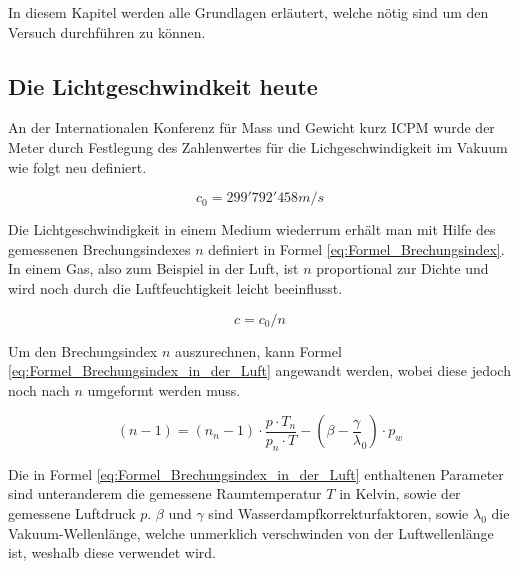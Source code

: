 In diesem Kapitel werden alle Grundlagen erläutert, welche nötig sind um den Versuch durchführen zu können. 
\subsection{Die Lichtgeschwindkeit heute}
An der Internationalen Konferenz für Mass und Gewicht kurz ICPM wurde der Meter durch Festlegung des Zahlenwertes für die Lichgeschwindigkeit im Vakuum wie folgt neu definiert.

\begin{equation*}
c_{0} = 299'792'458 m/s
\label{eq:Lichtgeschwindigkeit}
\end{equation*}

Die Lichtgeschwindigkeit in einem Medium wiederrum erhält man mit Hilfe des gemessenen Brechungsindexes $n$ definiert in Formel \ref{eq:Formel_Brechungsindex}. In einem Gas, also zum Beispiel in der Luft, ist $n$ proportional zur Dichte und wird noch durch die Luftfeuchtigkeit leicht beeinflusst.

\begin{equation}
c=c_{0}/n
\label{eq:Formel_Brechungsindex}
\end{equation}

Um den Brechungsindex $n$ auszurechnen, kann Formel \ref{eq:Formel_Brechungsindex_in_der_Luft} angewandt werden, wobei diese jedoch noch nach $n$ umgeformt werden muss.

\begin{equation}
(n - 1) = (n_{n} - 1)\cdot\dfrac{p \cdot T_{n}}{p_{n} \cdot T}-(\beta - \dfrac{\gamma}{\lambda}_{0}) \cdot p_{w}
\label{eq:Formel_Brechungsindex_in_der_Luft}
\end{equation}

Die in Formel \ref{eq:Formel_Brechungsindex_in_der_Luft} enthaltenen Parameter sind unteranderem die gemessene Raumtemperatur $T$ in Kelvin, sowie der gemessene Luftdruck $p$. $\beta$ und $\gamma$ sind Wasserdampfkorrekturfaktoren, sowie $\lambda_{0}$ die Vakuum-Wellenlänge, welche unmerklich verschwinden von der Luftwellenlänge ist, weshalb diese verwendet wird.

